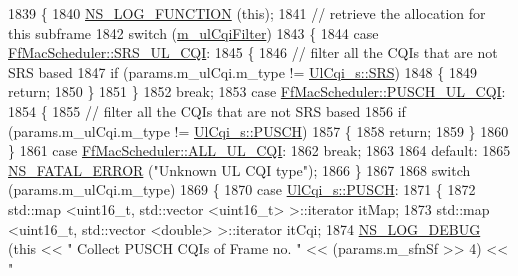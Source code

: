 \begin{DoxyCode}
1839 \{
1840   \hyperlink{log-macros-disabled_8h_a90b90d5bad1f39cb1b64923ea94c0761}{NS\_LOG\_FUNCTION} (\textcolor{keyword}{this});
1841 \textcolor{comment}{// retrieve the allocation for this subframe}
1842   \textcolor{keywordflow}{switch} (\hyperlink{classns3_1_1FfMacScheduler_adae16e66a1c4231da80a1221297442cf}{m\_ulCqiFilter})
1843     \{
1844     \textcolor{keywordflow}{case} \hyperlink{classns3_1_1FfMacScheduler_aa47a9eb25f2c558c825b0be645304a52af2e0df473ba2c8f9cb131cb760591aed}{FfMacScheduler::SRS\_UL\_CQI}:
1845       \{
1846         \textcolor{comment}{// filter all the CQIs that are not SRS based}
1847         \textcolor{keywordflow}{if} (params.m\_ulCqi.m\_type != \hyperlink{structns3_1_1UlCqi__s_aece9e5ebea42eb9ff1744c72c8459b57af4b6dba4243636562c910c4d4761dd7e}{UlCqi\_s::SRS})
1848           \{
1849             \textcolor{keywordflow}{return};
1850           \}
1851       \}
1852       \textcolor{keywordflow}{break};
1853     \textcolor{keywordflow}{case} \hyperlink{classns3_1_1FfMacScheduler_aa47a9eb25f2c558c825b0be645304a52a4a833bc779439b15bd904e1dd8eaa563}{FfMacScheduler::PUSCH\_UL\_CQI}:
1854       \{
1855         \textcolor{comment}{// filter all the CQIs that are not SRS based}
1856         \textcolor{keywordflow}{if} (params.m\_ulCqi.m\_type != \hyperlink{structns3_1_1UlCqi__s_aece9e5ebea42eb9ff1744c72c8459b57a9716b20a3095c473ae3fde1eb5d0bb63}{UlCqi\_s::PUSCH})
1857           \{
1858             \textcolor{keywordflow}{return};
1859           \}
1860       \}
1861     \textcolor{keywordflow}{case} \hyperlink{classns3_1_1FfMacScheduler_aa47a9eb25f2c558c825b0be645304a52a84059a597c72335f0a5963c3efcbda71}{FfMacScheduler::ALL\_UL\_CQI}:
1862       \textcolor{keywordflow}{break};
1863 
1864     \textcolor{keywordflow}{default}:
1865       \hyperlink{group__fatal_ga5131d5e3f75d7d4cbfd706ac456fdc85}{NS\_FATAL\_ERROR} (\textcolor{stringliteral}{"Unknown UL CQI type"});
1866     \}
1867 
1868   \textcolor{keywordflow}{switch} (params.m\_ulCqi.m\_type)
1869     \{
1870     \textcolor{keywordflow}{case} \hyperlink{structns3_1_1UlCqi__s_aece9e5ebea42eb9ff1744c72c8459b57a9716b20a3095c473ae3fde1eb5d0bb63}{UlCqi\_s::PUSCH}:
1871       \{
1872         std::map <uint16\_t, std::vector <uint16\_t> >::iterator itMap;
1873         std::map <uint16\_t, std::vector <double> >::iterator itCqi;
1874         \hyperlink{group__logging_ga413f1886406d49f59a6a0a89b77b4d0a}{NS\_LOG\_DEBUG} (\textcolor{keyword}{this} << \textcolor{stringliteral}{" Collect PUSCH CQIs of Frame no. "} << (params.m\_sfnSf >> 4) << \textcolor{stringliteral}{"
}
\end{DoxyCode}
